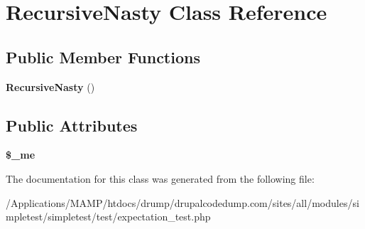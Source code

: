 \hypertarget{class_recursive_nasty}{
\section{RecursiveNasty Class Reference}
\label{class_recursive_nasty}
}
\subsection*{Public Member Functions}
\begin{DoxyCompactItemize}
\item 
\hypertarget{class_recursive_nasty_af0b2e6fce562ccfa97e4c3e15fd6147c}{
{\bfseries RecursiveNasty} ()}
\label{class_recursive_nasty_af0b2e6fce562ccfa97e4c3e15fd6147c}

\end{DoxyCompactItemize}
\subsection*{Public Attributes}
\begin{DoxyCompactItemize}
\item 
\hypertarget{class_recursive_nasty_ac35c46c7ad1c11e91896c295c8e5b614}{
{\bfseries \$\_\-me}}
\label{class_recursive_nasty_ac35c46c7ad1c11e91896c295c8e5b614}

\end{DoxyCompactItemize}


The documentation for this class was generated from the following file:\begin{DoxyCompactItemize}
\item 
/Applications/MAMP/htdocs/drump/drupalcodedump.com/sites/all/modules/simpletest/simpletest/test/expectation\_\-test.php\end{DoxyCompactItemize}
